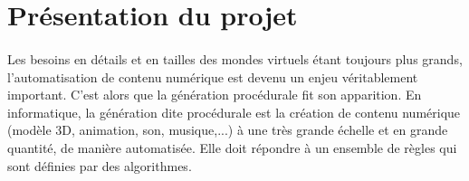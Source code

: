 \documentclass[a4paper]{article}
\begin{document}
\begin{titlepage}






\vfill %

\end{titlepage}

\newpage

\tableofcontents

\newpage

\section{Présentation du projet}

\paragraph{}
Les besoins en détails et en tailles des mondes virtuels étant toujours plus grands, l'automatisation de contenu numérique est devenu un enjeu véritablement important. C'est alors que la génération procédurale fit son apparition. En informatique, la génération dite procédurale est la création de contenu numérique (modèle 3D, animation, son, musique,...) à une très grande échelle et en grande quantité, de manière automatisée. Elle doit répondre à un ensemble de règles qui sont définies par des algorithmes.
\end{document}
